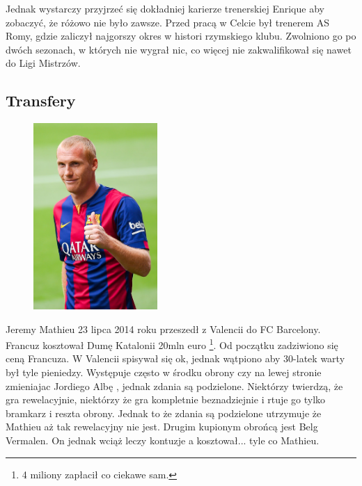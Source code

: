 \documentclass[11pt, a4paper]{article}
\begin{document}
Jednak wystarczy przyjrzeć się dokładniej karierze trenerskiej Enrique aby zobaczyć, że różowo nie było zawsze. Przed pracą w Celcie był trenerem AS Romy, gdzie zaliczył najgorszy okres w histori rzymskiego klubu. Zwolniono go po dwóch sezonach, w których nie wygrał nic, co więcej nie zakwalifikował się nawet do Ligi Mistrzów.
\newpage

\subsection{Transfery}
\begin{figure}
\begin{center}
\includegraphics[width=0.42\textwidth]{mathieu.jpg}
\end{center}

\label{img:Mathieu}
\end{figure}
Jeremy Mathieu 23 lipca 2014 roku przeszedł z Valencii do FC Barcelony. Francuz kosztował Dumę Katalonii 20mln euro \footnote{4 miliony zapłacił co ciekawe sam.}. Od początku zadziwiono się ceną Francuza. W Valencii spisywał się ok, jednak wątpiono aby 30-latek warty był tyle pieniedzy. Występuje często w środku obrony czy na lewej stronie zmieniajac Jordiego Albę , jednak zdania są podzielone. Niektórzy twierdzą, że gra rewelacyjnie, niektórzy że gra kompletnie beznadziejnie i rtuje go tylko bramkarz i reszta obrony. Jednak to że zdania są podzielone utrzymuje że Mathieu aż tak rewelacyjny nie jest. Drugim kupionym obrońcą jest Belg Vermalen. On jednak wciąż leczy kontuzje a kosztował... tyle co Mathieu.
\end{document}
